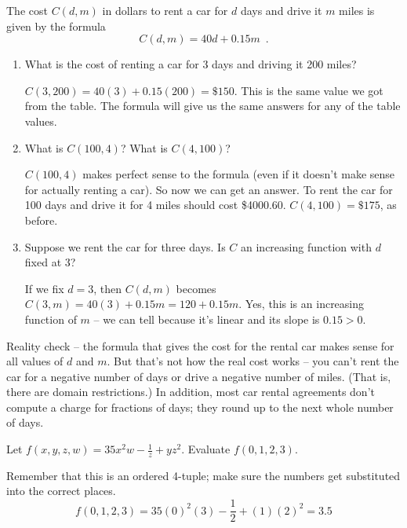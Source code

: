 \begin{example}
The cost $C(d,m)$ in dollars to rent a car for $d$ days and drive it $m$ miles is given by the formula
$$C(d,m)=40d+0.15m \enspace .$$

\begin{enumerate}[label=(\alph*)]
    \item What is the cost of renting a car for 3 days and driving it 200 miles?

    \begin{solution}
     $C(3,200) = 40(3)+0.15(200)=\$150$. This is the same value we got from the table. The formula will give us the same answers for any of the table values.
    \end{solution}
    \item What is $C(100,4)$? What is $C(4,100)$?

    \begin{solution}
    $C(100,4)$ makes perfect sense to the formula (even if it doesn't make sense for actually renting a car). So now we can get an answer. To rent the car for 100 days and drive it for 4 miles should cost \$4000.60. $C(4,100)=\$175$, as before.
    \end{solution}
    \item Suppose we rent the car for three days. Is $C$ an increasing function with $d$ fixed at 3?

    \begin{solution}
    If we fix $d=3$, then $C(d,m)$ becomes $C(3,m)=40(3)+0.15m=120+0.15m$. Yes, this is an increasing function of $m$ -- we can tell because it's linear and its slope is $0.15>0$.
    \end{solution}
\end{enumerate}
\end{example}

Reality check -- the formula that gives the cost for the rental car makes sense for all values of $d$ and $m$. But that's not how the real cost works -- you can't rent the car for a negative number of days or drive a negative number of miles. (That is, there are domain restrictions.) In addition, most car rental agreements don't compute a charge for fractions of days; they round up to the next whole number of days.

\begin{example}
Let $f(x,y,z,w)=35x^2w-\frac{1}{z}+yz^2$. Evaluate $f(0,1,2,3)$.

\begin{solution} Remember that this is an ordered 4-tuple; make sure the numbers get substituted into the correct places.
$$f(0,1,2,3)= 35(0)^2(3)-\frac{1}{2}+(1)(2)^2 = 3.5$$
\end{solution}\end{example}

